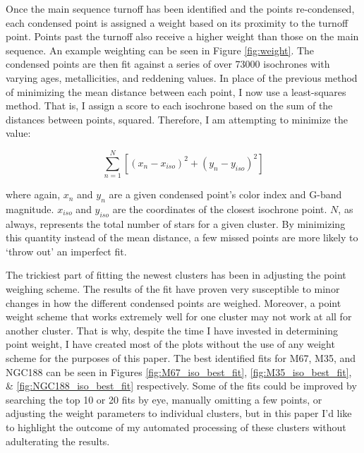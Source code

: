 \documentclass[aps,prb,twocolumn,groupedaddress,nofootinbib,floatfix]{revtex4-1}
\newcommand{\beq}{\begin{equation}}
\newcommand{\eeq}{\end{equation}}
\begin{document}
Once the main sequence turnoff has been identified and the points re-condensed, each condensed point is assigned a weight based on its proximity to the turnoff point. Points past the turnoff also receive a higher weight than those on the main sequence. An example weighting can be seen in Figure \ref{fig:weight}. The condensed points are then fit against a series of over 73000 isochrones with varying ages, metallicities, and reddening values. In place of the previous method of minimizing the mean distance between each point, I now use a least-squares method. That is, I assign a score to each isochrone based on the sum of the distances between points, squared. Therefore, I am attempting to minimize the value:

\beq
\sum\limits_{n=1}^{N}\left[\left(x_n-x_{iso}\right)^2+\left(y_n-y_{iso}\right)^2\right]
\eeq

where again, $x_n$ and $y_n$ are a given condensed point's color index and G-band magnitude. $x_{iso}$ and $y_{iso}$ are the coordinates of the closest isochrone point. $N$, as always, represents the total number of stars for a given cluster. By minimizing this quantity instead of the mean distance, a few missed points are more likely to `throw out' an imperfect fit.

The trickiest part of fitting the newest clusters has been in adjusting the point weighing scheme. The results of the fit have proven very susceptible to minor changes in how the different condensed points are weighed. Moreover, a point weight scheme that works extremely well for one cluster may not work at all for another cluster. That is why, despite the time I have invested in determining point weight, I have created most of the plots without the use of any weight scheme for the purposes of this paper. The best identified fits for M67, M35, and NGC188 can be seen in Figures \ref{fig:M67_iso_best_fit}, \ref{fig:M35_iso_best_fit}, \& \ref{fig:NGC188_iso_best_fit} respectively. Some of the fits could be improved by searching the top 10 or 20 fits by eye, manually omitting a few points, or adjusting the weight parameters to individual clusters, but in this paper I'd like to highlight the outcome of my automated processing of these clusters without adulterating the results.
\end{document}
